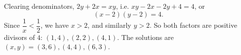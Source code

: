 Clearing denominators, $2y+2x=xy$, i.e. $xy-2x-2y+4=4$, or
\[(x-2)(y-2)=4.\]
Since $\dfrac1x<\dfrac12$, we have $x>2$, and similarly $y>2$. So both factors are positive divisors of $4$: $(1,4),(2,2),(4,1)$. The solutions are $\boxed{(x,y)=(3,6),(4,4),(6,3)}$.
